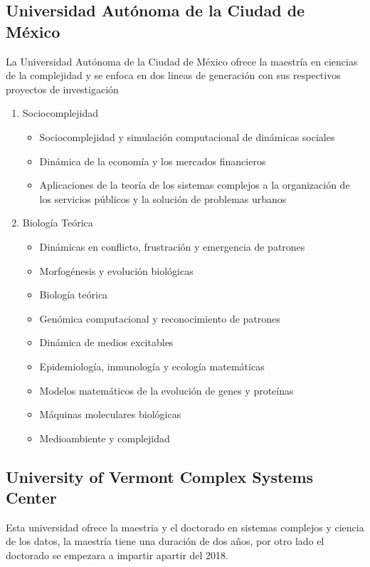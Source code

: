\documentclass[a4paper,12pt]{article}
\begin{document}
\subsection{Universidad Autónoma de la Ciudad de México}
La Universidad Autónoma de la Ciudad de México ofrece la maestría en ciencias de la complejidad y se enfoca en dos lineas de generación con sus respectivos proyectos de investigación
\begin{enumerate}
 \item Sociocomplejidad
 \begin{itemize}
  \item Sociocomplejidad y simulación computacional de dinámicas sociales
  \item Dinámica de la economía y los mercados financieros
  \item Aplicaciones de la teoría de los sistemas complejos a la organización de los servicios públicos y la solución de problemas urbanos
 \end{itemize}

 \item Biología Teórica
 \begin{itemize}
  \item Dinámicas en conflicto, frustración y emergencia de patrones
  \item Morfogénesis y evolución biológicas
  \item Biología teórica
  \item Genómica computacional y reconocimiento de patrones
  \item Dinámica de medios excitables
  \item Epidemiología, inmunología y ecología matemáticas
  \item Modelos matemáticos de la evolución de genes y proteínas
  \item Máquinas moleculares biológicas
  \item Medioambiente y complejidad
 \end{itemize}

\end{enumerate}

\subsection{University of Vermont Complex  Systems Center}
Esta universidad ofrece la maestria y el doctorado en sistemas complejos y ciencia de los datos, la maestría tiene una duración de dos años, por otro lado el doctorado se empezara a impartir apartir del 2018.
\end{document}

